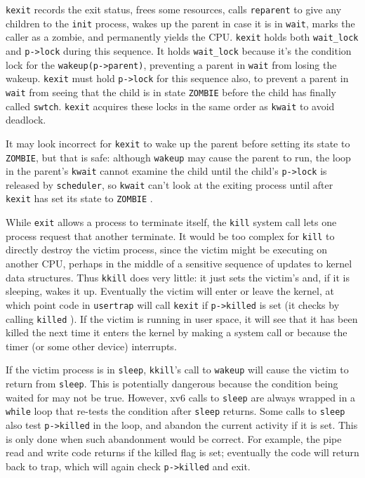 \lstinline{kexit}  records the exit
status, frees some resources, calls \lstinline{reparent} to give any
children to the \lstinline{init} process, wakes up the parent in case
it is in \lstinline{wait}, marks the caller as a zombie, and
permanently yields the CPU. \lstinline{kexit} holds both
\lstinline{wait_lock} and \lstinline{p->lock} during this
sequence.
It holds \lstinline{wait_lock} because 
it's the condition
lock for the \lstinline{wakeup(p->parent)}, preventing a parent in
\lstinline{wait} from losing the wakeup. \lstinline{kexit} must hold
\lstinline{p->lock} for this sequence also, to prevent a parent in
\lstinline{wait} from seeing that the child is in state
\lstinline{ZOMBIE} before the child has finally called
\lstinline{swtch}. \lstinline{kexit} acquires these locks in
the same order as \lstinline{kwait} to avoid deadlock.

It may look incorrect for \lstinline{kexit} to wake up the parent
before setting its state to \lstinline{ZOMBIE}, 
but that is safe:
although
\lstinline{wakeup}
may cause the parent to run,
the loop in the parent's
\lstinline{kwait}
cannot examine the child until the child's
\lstinline{p->lock}
is released by {\tt scheduler},
so
\lstinline{kwait}
can't look at
the exiting process until after
\lstinline{kexit}
has set its state to
\lstinline{ZOMBIE}
.

While
\lstinline{exit} 
allows a process to terminate itself,
the \lstinline{kill} system call
lets one process request that another terminate.
It would be too complex for
\lstinline{kill}
to directly destroy the victim process, since the victim
might be executing on another CPU, perhaps
in the middle of a sensitive sequence of updates to kernel data structures.
Thus
\lstinline{kkill}
does very little: it just sets the victim's
and, if it is sleeping, wakes it up.
Eventually the victim will enter or leave the kernel,
at which point code in
\lstinline{usertrap}
will call
\lstinline{kexit}
if
\lstinline{p->killed}
is set
(it checks by calling
\lstinline{killed}
).
If the victim is running in user space, it will 
see that it has been killed the next time it enters
the kernel by making a system call or because the timer (or
some other device) interrupts.

If the victim process is in
\lstinline{sleep},
\lstinline{kkill}'s call to
\lstinline{wakeup}
will cause the victim to return from
\lstinline{sleep}.
This is potentially dangerous because 
the condition being waited for may not be true.
However, xv6 calls to
\lstinline{sleep}
are always wrapped in a
\lstinline{while}
loop that re-tests the condition after
\lstinline{sleep}
returns.
Some calls to
\lstinline{sleep}
also test
\lstinline{p->killed}
in the loop, and abandon the current activity if it is set.
This is only done when such abandonment would be correct.
For example, the pipe read and write code
returns if the killed flag is set; eventually the
code will return back to trap, which will again
check \lstinline{p->killed} and exit.

